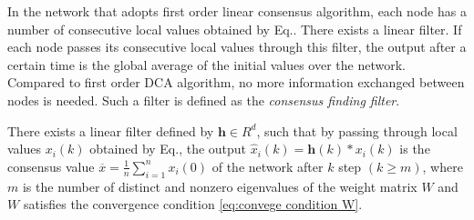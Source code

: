 In the network that adopts first order linear consensus algorithm,
each node has a number of consecutive local values obtained by Eq..
There exists a linear filter. If each node passes its consecutive
local values through this filter, the output after a certain time
is the global average of the initial values over the network. Compared
to first order DCA algorithm, no more information exchanged between
nodes is needed. Such a filter is defined as the \textit{consensus
finding filter}. 
\begin{thm}
\label{thm.A-consensus-finding}There exists a linear filter defined
by $\mathbf{h}\in R^{d}$, such that by passing through local values
\textup{$x_{i}(k)$} \textup{obtained by Eq.,
}the output \textup{$\hat{x}_{i}(k)=\mathbf{h}(k)*x_{i}(k)$} is the
consensus value \textup{$\overline{x}=\frac{1}{n}\sum_{i=1}^{n}x_{i}(0)$}
of the network after $k$ step $\left(k\geqslant m\right)$, where
\textup{$m$ is the number of} distinct and nonzero eigenvalues of
the weight matrix $W$ and $W$ satisfies the convergence condition\textup{
\ref{eq:convege condition W}. }\end{thm}
